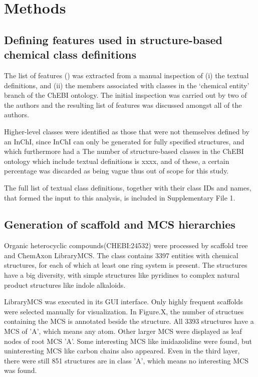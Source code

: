 \documentclass[10pt]{bmc_article}
\newenvironment{bmcformat}{\baselineskip20pt\sloppy\setboolean{publ}{false}}{\baselineskip20pt\sloppy}
\begin{document}
\begin{bmcformat}
\section*{Methods}

\subsection*{Defining features used in structure-based chemical class definitions}

The list of features () was extracted from a manual inspection of (i) the textual definitions, and (ii) the members associated with classes in the `chemical entity' branch of the ChEBI ontology. The initial inspection was carried out by two of the authors and the resulting list of features was discussed amongst all of the authors. 

Higher-level classes were identified as those that were not themselves defined by an InChI, since InChI can only be generated for fully specified structures, and which furthermore had a  The number of structure-based classes in the ChEBI ontology which include textual definitions is xxxx, and of these, a certain percentage was discarded as being vague thus out of scope for this study. 

The full list of textual class definitions, together with their class IDs and names, that formed the input to this analysis, is included in Supplementary File 1. %


\subsection*{Generation of scaffold and MCS hierarchies}

Organic heterocyclic compounds(CHEBI:24532) were processed by scaffold tree and ChemAxon LibraryMCS. The class contains 3397 entities with chemical structures, for each of which at least one ring system is present. The structures have a big diversity, with simple structures like pyridines to complex natural product structures like indole alkaloids. 

LibraryMCS was executed in its GUI interface. Only highly frequent scaffolds were selected manually for visualization. In Figure.X, the number of structues containing the MCS is annotated beside the structure. All 3393 structures have a MCS of 'A', which means any atom. Other larger MCS were displayed as leaf nodes of root MCS 'A'. Some interesting MCS like imidazolidine were found, but uninteresting MCS like carbon chains also appeared. Even in the third layer, there were still 851 structures are in class 'A', which means no interesting MCS was found.


\end{bmcformat}
\end{document}
